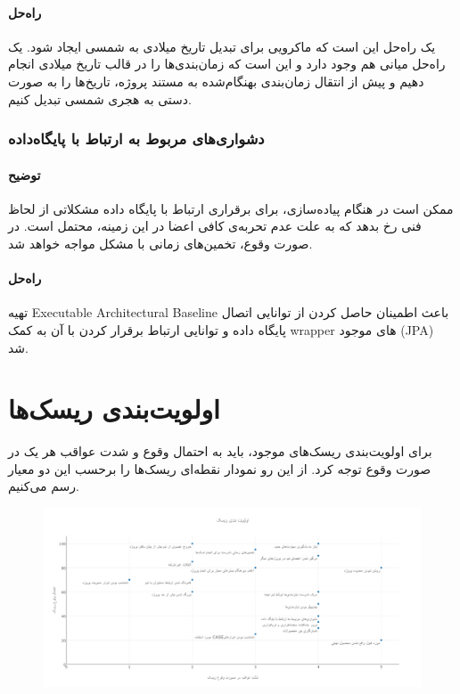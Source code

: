 \paragraph{راه‌حل}
یک راه‌حل این است که ماکرویی برای تبدیل تاریخ میلادی به شمسی ایجاد شود. یک راه‌حل  میانی هم وجود دارد و این است که زمان‌بندی‌ها را در قالب تاریخ میلادی انجام دهیم و پیش از انتقال زمان‌بندی بهنگام‌شده به مستند پروژه، تاریخ‌ها را به صورت دستی به هجری شمسی تبدیل کنیم.
\subsubsection{دشواری‌های مربوط به ارتباط با پایگاه‌داده}
\paragraph{توضیح}
ممکن است در هنگام پیاده‌سازی، برای برقراری ارتباط با پایگاه داده مشکلاتی از لحاظ فنی رخ بدهد که به علت عدم تحربه‌ی کافی اعضا در این زمینه، محتمل است. در صورت وقوع، تخمین‌های زمانی با مشکل مواجه خواهد شد.
\paragraph{راه‌حل}
تهیه Executable Architectural Baseline باعث اطمینان حاصل کردن از توانایی اتصال پایگاه داده و توانایی ارتباط برقرار کردن با آن به کمک wrapper های موجود (JPA) شد.

\section{اولویت‌بندی ریسک‌ها}
برای اولویت‌بندی ریسک‌های موجود، باید به احتمال وقوع و شدت عواقب هر یک در صورت وقوع توجه کرد. از این رو نمودار نقطه‌ای ریسک‌ها را برحسب این دو معیار رسم می‌کنیم.\\

\begin{figure}[H]
	\centering
	\includegraphics[scale=0.3]{img/risk_prioritization}
\end{figure}

